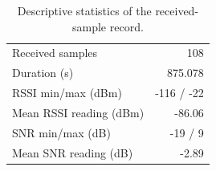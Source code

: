 \begin{table}[htbp]\centering
\caption{Descriptive statistics of the received-sample record.}
\begin{tabular}{lr}\hline
Received samples & 108 \\
Duration (s) & 875.078 \\
RSSI min/max (dBm) & -116 / -22 \\
Mean RSSI reading (dBm) & -86.06 \\
SNR min/max (dB) & -19 / 9 \\
Mean SNR reading (dB) & -2.89 \\
\hline\end{tabular}\label{tab:metrics}\end{table}
